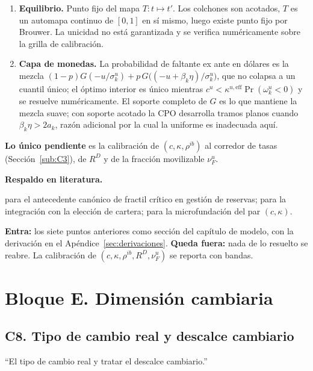 \documentclass[11pt]{article}
\newcommand{\lit}{\par\noindent\textbf{Respaldo en literatura.}\par}
\theoremstyle{definition}
\begin{document}
\begin{enumerate}[leftmargin=*,itemsep=2pt]
\item \textbf{Equilibrio.} Punto fijo del mapa $T:t\mapsto t'$. Los colchones son
acotados, $T$ es un automapa continuo de $[0,1]$ en s\'i mismo, luego existe punto
fijo por Brouwer. La unicidad no est\'a garantizada y se verifica num\'ericamente
sobre la grilla de calibraci\'on.
\item \textbf{Capa de monedas.} La probabilidad de faltante ex ante en d\'olares
es la mezcla $(1-p)G(-u/\sigma^u_k)+p\,G\big((-u+\beta_k\eta)/\sigma^u_k\big)$,
que no colapsa a un cuantil \'unico; el \'optimo interior es \'unico mientras
$c^u<\kappa^{u,\mathrm{eff}}\Pr(\omega^u_k<0)$ y se resuelve num\'ericamente. El
soporte completo de $G$ es lo que mantiene la mezcla suave; con soporte acotado
la CPO desarrolla tramos planos cuando $\beta_k\eta>2a_k$, raz\'on adicional por
la cual la uniforme es inadecuada aqu\'i.
\end{enumerate}

\noindent \textbf{Lo \'unico pendiente} es la calibraci\'on de $(c,\kappa,\rho^{ib})$
al corredor de tasas (Secci\'on~\ref{sub:C3}), de $R^D$ y de la fracci\'on
movilizable $\nu^u_F$.

\lit
\citet{poole1968} para el antecedente can\'onico de fractil cr\'itico en gesti\'on de
reservas; \citet{baltensperger1980} para la integraci\'on con la elecci\'on de
cartera; \citet{bianchibigio2022} para la microfundaci\'on del par $(c,\kappa)$.

\begin{ie2}
\textbf{Entra:} los siete puntos anteriores como secci\'on del cap\'itulo de modelo,
con la derivaci\'on en el Ap\'endice~\ref{sec:derivaciones}.
\textbf{Queda fuera:} nada de lo resuelto se reabre. La calibraci\'on de
$(c,\kappa,\rho^{ib},R^D,\nu^u_F)$ se reporta con bandas.
\end{ie2}

\section{Bloque E. Dimensi\'on cambiaria}

\subsection{C8. Tipo de cambio real y descalce cambiario}\label{sub:C8}

\begin{jurado}
``El tipo de cambio real y tratar el descalce cambiario.''
\end{jurado}
\end{document}

